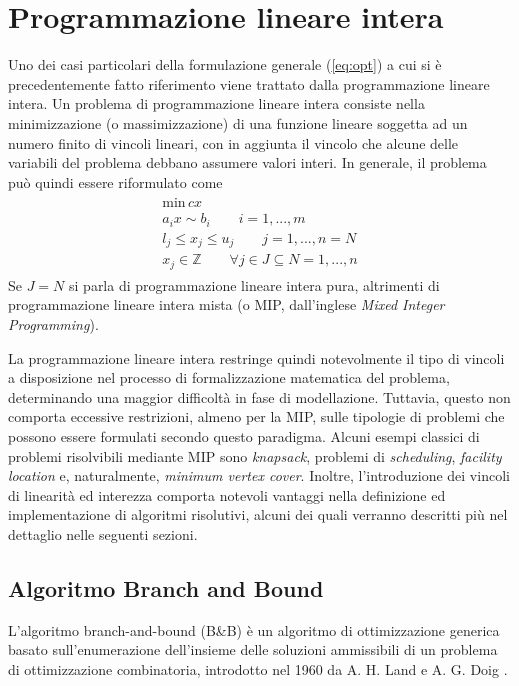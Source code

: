 \section{Programmazione lineare intera}
Uno dei casi particolari della formulazione generale (\ref{eq:opt}) a cui si è precedentemente fatto riferimento viene trattato dalla programmazione lineare intera.
Un problema di programmazione lineare intera consiste nella minimizzazione (o massimizzazione) di una funzione lineare soggetta ad un 
numero finito di vincoli lineari, con in aggiunta il vincolo che alcune delle variabili del problema debbano assumere valori interi. 
In generale, il problema può quindi essere riformulato come
\begin{align*}
	\begin{array}{l}
      \text{min} \, cx\\
      a_i x \sim b_i \qquad i=1,...,m \\
      l_j \leq x_j \leq u_j \qquad j=1,...,n =N \\
      x_j \in \mathbb{Z}  \qquad \forall j \in J \subseteq N = {1,...,n}	
	\end{array}
\end{align*}
\indent
Se $J=N$ si parla di programmazione lineare intera pura, altrimenti di programmazione lineare intera mista (o MIP, dall'inglese 
\textit{Mixed Integer Programming}).

La programmazione lineare intera restringe quindi notevolmente il tipo di vincoli a disposizione nel
processo di formalizzazione matematica del problema, determinando una maggior difficoltà in fase di modellazione.
Tuttavia, questo non comporta eccessive restrizioni, almeno per la MIP, sulle tipologie di problemi che possono essere formulati 
secondo questo paradigma. Alcuni esempi classici di problemi risolvibili mediante MIP sono \textit{knapsack}, problemi di 
\textit{scheduling}, \textit{facility location} e, naturalmente, \textit{minimum vertex cover}.
Inoltre, l'introduzione dei vincoli di linearità ed interezza comporta notevoli vantaggi nella definizione ed
implementazione di algoritmi risolutivi, alcuni dei quali verranno descritti più nel dettaglio nelle seguenti sezioni.

\subsection{Algoritmo Branch and Bound}
L'algoritmo branch-and-bound (B\&B) è un algoritmo di ottimizzazione generica basato sull'enumerazione dell'insieme delle soluzioni
ammissibili di un problema di ottimizzazione combinatoria, introdotto nel 1960 da A. H. Land e A. G. Doig \cite{10.2307/1910129}. 

